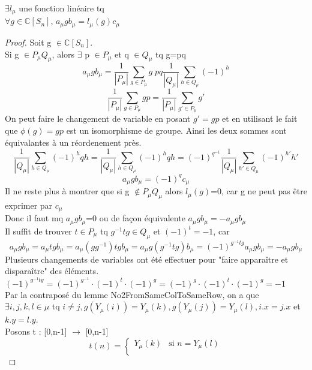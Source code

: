 \begin{lemma}[LinearTransformation]
    \label{LinearTransformation}
    $\exists l_{\mu}$ une fonction linéaire tq\\
    $\forall g \in \mathbb{C}[S_{n}]$, $a_{\mu} g b_{\mu} = l_{\mu}(g) c_{\mu}$
\end{lemma}
\begin{proof}
    Soit g $\in \mathbb{C}[S_{n}]$.\\
    Si g $\in P_{\mu} Q_{\mu}$, alors $\exists$ p $\in P_{\mu}$ et q $\in Q_{\mu}$ tq g=pq\\
    \[ a_{\mu} g b_{\mu} = \frac{1}{|P_{\mu}|}\sum_{g \in P_{\mu}}g \; p q \frac{1}{|Q_{\mu}|}\sum_{h \in Q_{\mu}}(-1)^{h} \]
    \[ \frac{1}{|P_{\mu}|}\sum_{g \in P_{\mu}}g p = \frac{1}{|P_{\mu}|}\sum_{g' \in P_{\mu}}g' \]
    On peut faire le changement de variable en posant $g' = g p$ et en utilisant le fait que $\phi (g) =g p$ est un isomorphisme de groupe. Ainsi les deux sommes sont équivalantes à un réordenement près.
    \[ \frac{1}{|Q_{\mu}|}\sum_{h \in Q_{\mu}}(-1)^{h}q h = \frac{1}{|Q_{\mu}|}\sum_{h \in Q_{\mu}}(-1)^{h}q h = (-1)^{q^{-1}} \frac{1}{|Q_{\mu}|}\sum_{h' \in Q_{\mu}}(-1)^{h'}h' \]
    \[ a_{\mu} g b_{\mu} = (-1)^{q}c_{\mu} \]
    Il ne reste plus à montrer que si g $\notin P_{\mu} Q_{\mu}$ alors $l_{\mu}(g)$=0, car g ne peut pas être exprimer par $c_{\mu}$\\
    Donc il faut mq $a_{\mu} g b_{\mu}$=0 ou de façon équivalente $a_{\mu} g b_{\mu} = -a_{\mu} g b_{\mu}$\\
    Il suffit de trouver $t \in P_{\mu}$ tq $g^{-1} t g \in Q_{\mu}$ et $(-1)^t = -1$, car
    \[ a_{\mu} g b_{\mu} = a_{\mu} t g b_{\mu} = a_{\mu} (g g^{-1}) t g b_{\mu} = a_{\mu} g (g^{-1} t g) b_{\mu} = (-1)^{g^{-1} t g} a_{\mu} g b_{\mu} = -a_{\mu} g b_{\mu} \]
    Plusieurs changements de variables ont été effectuer pour "faire apparaître et disparaître" des éléments. $(-1)^{g^{-1} t g} = (-1)^{g^{-1}}\cdot (-1)^{t}\cdot (-1)^{g} = (-1)^{g}\cdot (-1)^{t}\cdot (-1)^{g} = -1$\\
    Par la contraposé du lemme No2FromSameColToSameRow, on a que\\
    $\exists i,j,k,l \in \mu$ tq $i \neq j, g(Y_{\mu}(i))=Y_{\mu}(k), g(Y_{\mu}(j))=Y_{\mu}(l), i.x=j.x$ et $k.y = l.y$.\\
    Posons t : [0,n-1] $\to$ [0,n-1]
    \[ t(n) = \begin{cases} Y_{\mu}(k) & \text{si } n=Y_{\mu}(l)\\

\end{cases}\]
\end{proof}

